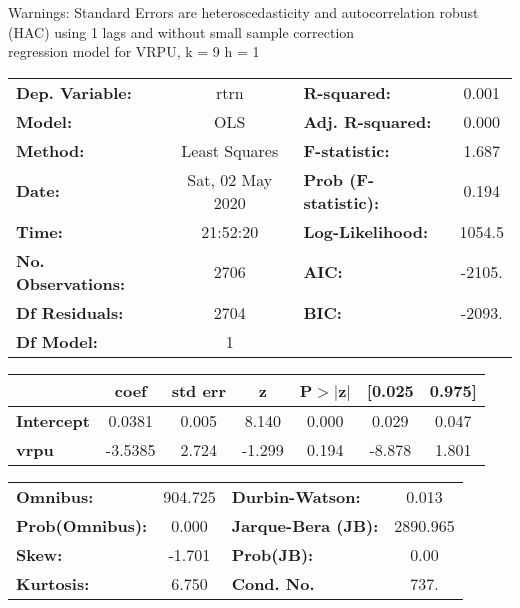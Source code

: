 Warnings: \newline
 [1] Standard Errors are heteroscedasticity and autocorrelation robust (HAC) using 1 lags and without small sample correction\\ 

regression model for VRPU, k = 9 h = 1\begin{center}
\begin{tabular}{lclc}
\toprule
\textbf{Dep. Variable:}    &       rtrn       & \textbf{  R-squared:         } &     0.001   \\
\textbf{Model:}            &       OLS        & \textbf{  Adj. R-squared:    } &     0.000   \\
\textbf{Method:}           &  Least Squares   & \textbf{  F-statistic:       } &     1.687   \\
\textbf{Date:}             & Sat, 02 May 2020 & \textbf{  Prob (F-statistic):} &    0.194    \\
\textbf{Time:}             &     21:52:20     & \textbf{  Log-Likelihood:    } &    1054.5   \\
\textbf{No. Observations:} &        2706      & \textbf{  AIC:               } &    -2105.   \\
\textbf{Df Residuals:}     &        2704      & \textbf{  BIC:               } &    -2093.   \\
\textbf{Df Model:}         &           1      & \textbf{                     } &             \\
\bottomrule
\end{tabular}
\begin{tabular}{lcccccc}
                   & \textbf{coef} & \textbf{std err} & \textbf{z} & \textbf{P$> |$z$|$} & \textbf{[0.025} & \textbf{0.975]}  \\
\midrule
\textbf{Intercept} &       0.0381  &        0.005     &     8.140  &         0.000        &        0.029    &        0.047     \\
\textbf{vrpu}      &      -3.5385  &        2.724     &    -1.299  &         0.194        &       -8.878    &        1.801     \\
\bottomrule
\end{tabular}
\begin{tabular}{lclc}
\textbf{Omnibus:}       & 904.725 & \textbf{  Durbin-Watson:     } &    0.013  \\
\textbf{Prob(Omnibus):} &   0.000 & \textbf{  Jarque-Bera (JB):  } & 2890.965  \\
\textbf{Skew:}          &  -1.701 & \textbf{  Prob(JB):          } &     0.00  \\
\textbf{Kurtosis:}      &   6.750 & \textbf{  Cond. No.          } &     737.  \\
\bottomrule
\end{tabular}
\end{center}

